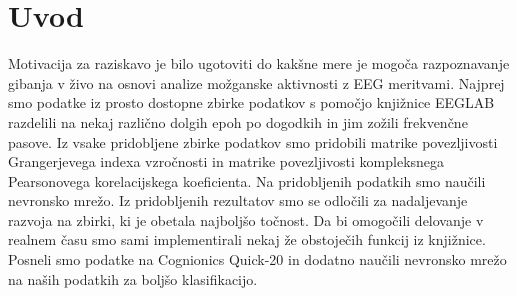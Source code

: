 \chapter{Uvod}
\thispagestyle{fancy}
Motivacija za raziskavo je bilo ugotoviti do kakšne mere je mogoča razpoznavanje gibanja v živo na osnovi analize možganske aktivnosti z EEG meritvami. Najprej smo podatke iz prosto dostopne zbirke podatkov s pomočjo knjižnice EEGLAB razdelili na nekaj različno dolgih epoh po dogodkih in jim zožili frekvenčne pasove. Iz vsake pridobljene zbirke podatkov smo pridobili matrike povezljivosti Grangerjevega indexa vzročnosti in matrike povezljivosti kompleksnega Pearsonovega korelacijskega koeficienta. Na pridobljenih podatkih smo naučili nevronsko mrežo. Iz pridobljenih rezultatov smo se odločili za nadaljevanje razvoja na zbirki, ki je obetala najboljšo točnost. Da bi omogočili delovanje v realnem času smo sami implementirali nekaj že obstoječih funkcij iz knjižnice. Posneli smo podatke na Cognionics Quick-20 in dodatno naučili nevronsko mrežo na naših podatkih za boljšo klasifikacijo.
\newpage
